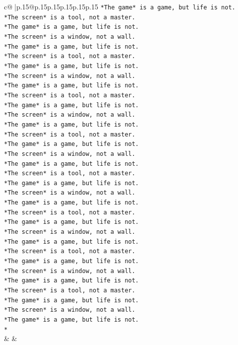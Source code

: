 \documentclass{article}
\begin{document}
{\begin{supertabular}{c@{$\;$}|p{.15\linewidth}@{}p{.15\linewidth}p{.15\linewidth}p{.15\linewidth}p{.15\linewidth}p{.15\linewidth}}
{{{\texttt{*The game* is a game, but life is not.} \\
\texttt{*The screen* is a tool, not a master.} \\
\texttt{*The game* is a game, but life is not.} \\
\texttt{*The screen* is a window, not a wall.} \\
\texttt{*The game* is a game, but life is not.} \\
\texttt{*The screen* is a tool, not a master.} \\
\texttt{*The game* is a game, but life is not.} \\
\texttt{*The screen* is a window, not a wall.} \\
\texttt{*The game* is a game, but life is not.} \\
\texttt{*The screen* is a tool, not a master.} \\
\texttt{*The game* is a game, but life is not.} \\
\texttt{*The screen* is a window, not a wall.} \\
\texttt{*The game* is a game, but life is not.} \\
\texttt{*The screen* is a tool, not a master.} \\
\texttt{*The game* is a game, but life is not.} \\
\texttt{*The screen* is a window, not a wall.} \\
\texttt{*The game* is a game, but life is not.} \\
\texttt{*The screen* is a tool, not a master.} \\
\texttt{*The game* is a game, but life is not.} \\
\texttt{*The screen* is a window, not a wall.} \\
\texttt{*The game* is a game, but life is not.} \\
\texttt{*The screen* is a tool, not a master.} \\
\texttt{*The game* is a game, but life is not.} \\
\texttt{*The screen* is a window, not a wall.} \\
\texttt{*The game* is a game, but life is not.} \\
\texttt{*The screen* is a tool, not a master.} \\
\texttt{*The game* is a game, but life is not.} \\
\texttt{*The screen* is a window, not a wall.} \\
\texttt{*The game* is a game, but life is not.} \\
\texttt{*The screen* is a tool, not a master.} \\
\texttt{*The game* is a game, but life is not.} \\
\texttt{*The screen* is a window, not a wall.} \\
\texttt{*The game* is a game, but life is not.} \\
\texttt{*} \\
            }
        }
    }
    & & \\ \\


\end{supertabular}}
\end{document}
